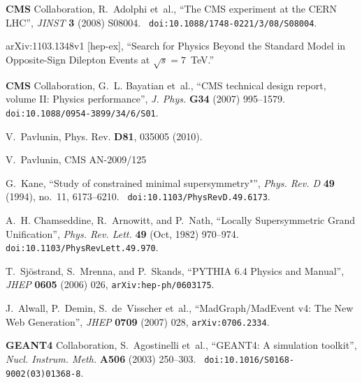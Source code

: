 \providecommand{\href}[2]{#2}\begingroup\raggedright\begin{thebibliography}{10}


{\bf CMS} Collaboration, R.~Adolphi {et~al.}, ``{The CMS experiment at the CERN
  LHC}'', {\em JINST} {\bf 3} (2008)
S08004.
  \href{http://dx.doi.org/10.1088/1748-0221/3/08/S08004}{{\tt
  doi:10.1088/1748-0221/3/08/S08004}}.

arXiv:1103.1348v1 [hep-ex], ``Search for Physics Beyond the Standard Model in Opposite-Sign Dilepton Events at $\sqrt{s} = 7$~TeV.''

{\bf CMS} Collaboration, G.~L. Bayatian {et~al.}, ``{CMS technical design
  report, volume II: Physics performance}'', {\em J. Phys.} {\bf G34} (2007)
995--1579.
  \href{http://dx.doi.org/10.1088/0954-3899/34/6/S01}{{\tt
  doi:10.1088/0954-3899/34/6/S01}}.

 V.~Pavlunin, Phys. Rev. {\bf D81}, 035005 (2010).
    
 V.~Pavlunin, CMS AN-2009/125

G.~Kane, ``Study of constrained minimal supersymmetry"'', {\em Phys. Rev. D}
  {\bf 49} (1994), no.~11, 6173--6210.
  \href{http://dx.doi.org/10.1103/PhysRevD.49.6173}{{\tt
  doi:10.1103/PhysRevD.49.6173}}.

A.~H. Chamseddine, R.~Arnowitt, and P.~Nath, ``Locally Supersymmetric Grand
  Unification'', {\em Phys. Rev. Lett.} {\bf 49} (Oct, 1982) 970--974.
  \href{http://dx.doi.org/10.1103/PhysRevLett.49.970}{{\tt
  doi:10.1103/PhysRevLett.49.970}}.


T.~Sj\"ostrand, S.~Mrenna, and P.~Skands, ``PYTHIA 6.4 Physics and Manual'',
  {\em JHEP} {\bf 0605} (2006) 026,
  \href{http://www.arXiv.org/abs/hep-ph/0603175}{{\tt arXiv:hep-ph/0603175}}.

J.~Alwall, P.~Demin, S.~de~Visscher{ et~al.}, ``MadGraph/MadEvent v4: The New
  Web Generation'', {\em JHEP} {\bf 0709} (2007) 028,
  \href{http://www.arXiv.org/abs/0706.2334}{{\tt arXiv:0706.2334}}.


{\bf GEANT4} Collaboration, S.~Agostinelli {et~al.}, ``{GEANT4: A simulation
  toolkit}'', {\em Nucl. Instrum. Meth.} {\bf A506} (2003)
250--303.
  \href{http://dx.doi.org/10.1016/S0168-9002(03)01368-8}{{\tt
  doi:10.1016/S0168-9002(03)01368-8}}.



\end{thebibliography}
